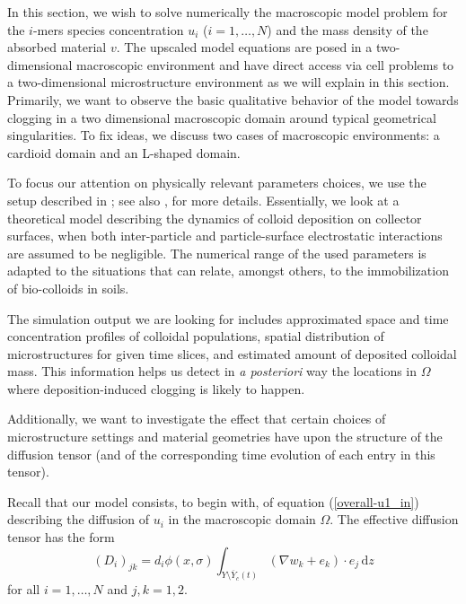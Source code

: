 \documentclass[reqno, 11pt]{amsart}
\numberwithin{equation}{section}
\newcommand{\di}[1]{\,\mathrm{d}#1}
\begin{document}
In this section, we wish to solve numerically the macroscopic model problem
for the $i$-mers species concentration $u_i$ ($i=1,\dots,N$) and the mass density of the absorbed material $v$. The upscaled model equations are posed in a two-dimensional macroscopic environment and have direct access via cell problems to a two-dimensional microstructure environment as we will explain in this section. 
Primarily, we want to observe the basic qualitative behavior of the model towards clogging in a
two dimensional  macroscopic domain around typical geometrical singularities. To fix ideas, we discuss two cases of macroscopic environments:  a cardioid domain and an L-shaped domain.  %

To focus our attention on physically relevant parameters choices, we use the setup described in \cite{johnson1995dynamics}; see also \cite{Krehel}, \cite{MC20} for more details.
Essentially, we look at a theoretical model describing the dynamics of colloid
deposition on collector surfaces,  when  both inter-particle and particle-surface electrostatic interactions   are assumed to be negligible.
The numerical range of the used parameters is adapted to the situations that can relate, amongst others, to the immobilization of bio-colloids in soils. 




The simulation output we are looking for includes approximated space and time concentration profiles of colloidal populations, spatial distribution of microstructures for given time slices, and estimated amount of deposited colloidal mass. This information helps us detect in {\em a posteriori} way the locations in $\Omega$ where deposition-induced clogging is likely to happen.

Additionally, we want to investigate the effect that  certain choices of  microstructure settings and material geometries have upon the structure of the diffusion tensor (and of the corresponding time evolution of each entry in this tensor).



Recall that our model consists, to begin with, of equation  (\ref{overall-u1_in}) describing the diffusion of $u_i$ in the macroscopic domain $\Omega$.
The effective diffusion tensor has the form  
$$(D_i)_{jk}=d_i\phi(x,\sigma)\int_{Y\setminus \overline{Y}_c(t)}(\nabla w_{k}+e_{k})\cdot e_j\di{z}$$
    for all $i=1,\ldots,N$ and $j,k=1,2$.
\end{document}
